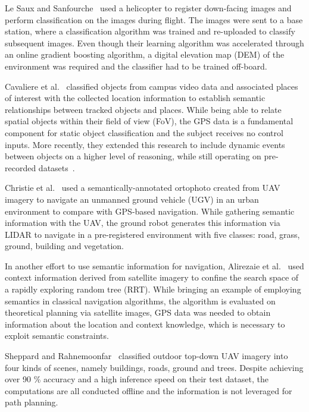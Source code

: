 \documentclass[a4paper,11pt]{article}
\theoremstyle{mytheor}
\begin{document}
Le Saux and Sanfourche~\cite{saux_rapid_2013} used a helicopter to register down-facing images and perform classification on the images during flight. The images were sent to a base station, where a classification algorithm was trained and re-uploaded to classify subsequent images. Even though their learning algorithm was accelerated through an online gradient boosting algorithm, a digital elevation map (DEM) of the environment was required and the classifier had to be trained off-board.

Cavaliere et al.~\cite{cavaliere_towards_2016} classified objects from campus video data and associated places of interest with the collected location information to establish semantic relationships between tracked objects and places. While being able to relate spatial objects within their field of view (FoV), the GPS data is a fundamental component for static object classification and the subject receives no control inputs. More recently, they extended this research to include dynamic events between objects on a higher level of reasoning, while still operating on pre-recorded datasets~\cite{cavaliere_empowering_2018}.

Christie et al.~\cite{christie_semantics_2016} used a semantically-annotated ortophoto created from UAV imagery to navigate an unmanned ground vehicle (UGV) in an urban environment to compare with GPS-based navigation. While gathering semantic information with the UAV, the ground robot generates this information via LIDAR to navigate in a pre-registered environment with five classes: road, grass, ground, building and vegetation. 

In another effort to use semantic information for navigation, Alirezaie et al.~\cite{alirezaie_exploiting_2017} used context information derived from satellite imagery to confine the search space of a rapidly exploring random tree (RRT). While bringing an example of employing semantics in classical navigation algorithms, the algorithm is evaluated on theoretical planning via satellite images, GPS data was needed to obtain information about the location and context knowledge, which is necessary to exploit semantic constraints.

Sheppard and Rahnemoonfar~\cite{sheppard_real-time_2017} classified outdoor top-down UAV imagery into four kinds of scenes, namely buildings, roads, ground and trees. Despite achieving over 90 \% accuracy and a high inference speed on their test dataset, the computations are all conducted offline and the information is not leveraged for path planning.
\end{document}
